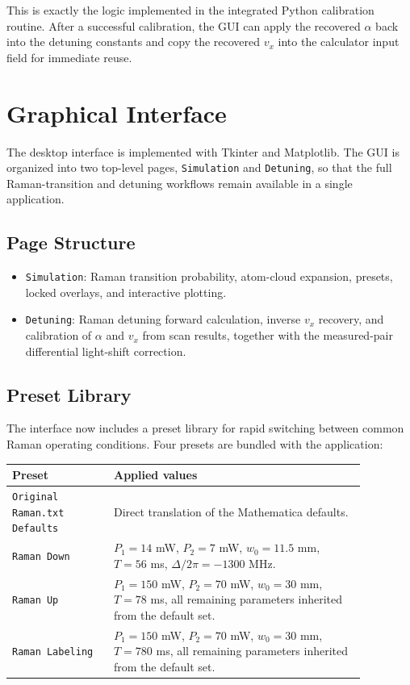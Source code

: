 \documentclass[11pt,a4paper]{article}
\begin{document}
This is exactly the logic implemented in the integrated Python calibration routine. After a
successful calibration, the GUI can apply the recovered $\alpha$ back into the detuning constants
and copy the recovered $v_x$ into the calculator input field for immediate reuse.

\section{Graphical Interface}

The desktop interface is implemented with Tkinter and Matplotlib. The GUI is organized into two
top-level pages, \texttt{Simulation} and \texttt{Detuning}, so that the full Raman-transition and
detuning workflows remain available in a single application.

\subsection{Page Structure}

\begin{itemize}
  \item \texttt{Simulation}: Raman transition probability, atom-cloud expansion, presets, locked
  overlays, and interactive plotting.
  \item \texttt{Detuning}: Raman detuning forward calculation, inverse $v_x$ recovery, and
  calibration of $\alpha$ and $v_x$ from scan results, together with the measured-pair
  differential light-shift correction.
\end{itemize}

\subsection{Preset Library}

The interface now includes a preset library for rapid switching between common Raman operating
conditions. Four presets are bundled with the application:

\begin{center}
\begin{tabular}{>{\raggedright\arraybackslash}p{0.25\linewidth} >{\raggedright\arraybackslash}p{0.62\linewidth}}
\toprule
Preset & Applied values \\
\midrule
\texttt{Original Raman.txt Defaults} & Direct translation of the Mathematica defaults. \\
\texttt{Raman Down} & $P_1 = 14$ mW, $P_2 = 7$ mW, $w_0 = 11.5$ mm, $T = 56$ ms, $\Delta / 2\pi = -1300$ MHz. \\
\texttt{Raman Up} & $P_1 = 150$ mW, $P_2 = 70$ mW, $w_0 = 30$ mm, $T = 78$ ms, all remaining parameters inherited from the default set. \\
\texttt{Raman Labeling} & $P_1 = 150$ mW, $P_2 = 70$ mW, $w_0 = 30$ mm, $T = 780$ ms, all remaining parameters inherited from the default set. \\
\bottomrule
\end{tabular}
\end{center}
\end{document}
